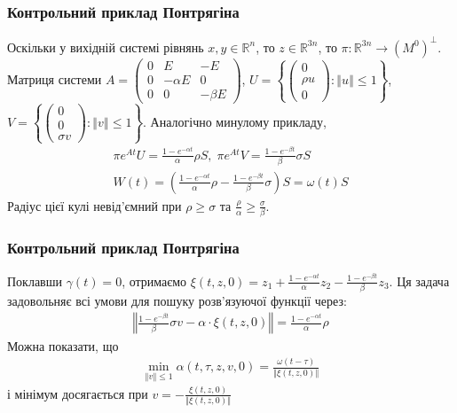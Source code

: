 \documentclass[10pt,pdf]{beamer}
\newcommand{\R}{\mathbb{R}}
\renewcommand{\l}{\left}
\renewcommand{\r}{\right}
\newcommand{\norm}[1]{\left\Vert #1 \right\Vert}
\begin{document}
    \begin{frame}
        \frametitle{Контрольний приклад Понтрягіна}
    
        Оскільки у вихідній системі рівнянь $x, y \in \R^n$, то $z \in \R^{3n}$,
        то $\pi : \R^{3n} \to (M^0)^\perp$. Матриця системи
        $A = \begin{pmatrix}
            0 & E & -E \\
            0 & -\alpha E & 0 \\
            0 & 0 & -\beta E
        \end{pmatrix}$,
        $
        U = \l\{ \begin{pmatrix}0 \\ \rho u \\ 0 \end{pmatrix} : \norm{u} \leq 1\r\}
        $,
        $
        V = \l\{ \begin{pmatrix}0 \\ 0 \\ \sigma v \end{pmatrix} : \norm{v} \leq 1\r\}
        $.
        Аналогічно минулому прикладу,
        \begin{gather*}
            \pi e^{At} U = \frac{1 - e^{-\alpha t}}{\alpha} \rho S, \;
            \pi e^{At} V = \frac{1 - e^{-\beta t}}{\beta} \sigma S \\
            W(t) = \l(\frac{1 - e^{-\alpha t}}{\alpha} \rho - \frac{1 - e^{-\beta t}}{\beta} \sigma\r) S = \omega(t) S
        \end{gather*}
        Радіус цієї кулі невід'ємний при $\rho \geq \sigma$ та $\frac{\rho}{\alpha} \geq \frac{\sigma}{\beta}$.
    
    \end{frame}
    \begin{frame}
        \frametitle{Контрольний приклад Понтрягіна}
    
        Поклавши $\gamma(t) = 0$, отримаємо
        $\xi(t, z, 0) = z_1 + \frac{1 - e^{-\alpha t}}{\alpha} z_2 - \frac{1 - e^{-\beta t}}{\beta}z_3$.
        Ця задача задовольняє всі умови для пошуку розв'язуючої функції через:
        \begin{gather*}
            \norm{\frac{1 - e^{-\beta t}}{\beta} \sigma v - \alpha \cdot \xi(t, z, 0)} = \frac{1 - e^{-\alpha t}}{\alpha} \rho
        \end{gather*}
        Можна показати, що 
        \begin{gather*}
            \underset{\norm{v}\leq 1}{\min}{\alpha(t, \tau, z, v, 0)} = \frac{\omega(t-\tau)}{\norm{\xi(t, z, 0)}}
        \end{gather*}
        і мінімум досягається при $v = -\frac{\xi(t, z, 0)}{\norm{\xi(t, z, 0)}}$
    
    \end{frame}
\end{document}

